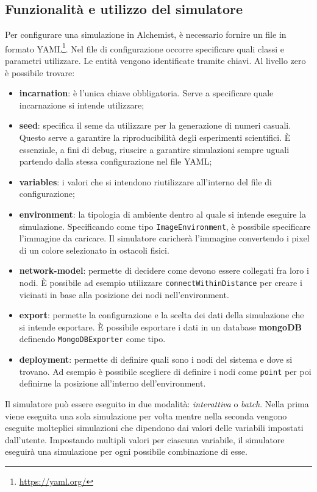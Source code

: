 \documentclass[12pt,a4paper,openright,twoside]{book}
\begin{document}
\subsection{Funzionalità e utilizzo del simulatore}
Per configurare una simulazione in Alchemist, è necessario fornire un file in formato YAML\footnote{\url{https://yaml.org/}}. Nel file di configurazione occorre specificare quali classi e parametri utilizzare. Le entità vengono identificate tramite chiavi. Al livello zero è possibile trovare: 
\begin{itemize}
    \item \textbf{incarnation}: è l'unica chiave obbligatoria. Serve a specificare quale incarnazione si intende utilizzare; 
    \item \textbf{seed}: specifica il seme da utilizzare per la generazione di numeri casuali. Questo serve a garantire la riproducibilità degli esperimenti scientifici. È essenziale, a fini di debug, riuscire a garantire simulazioni sempre uguali partendo dalla stessa configurazione nel file YAML;
    \item \textbf{variables}: i valori che si intendono riutilizzare all'interno del file di configurazione;
    \item \textbf{environment}: la tipologia di ambiente dentro al quale si intende eseguire la simulazione. Specificando come tipo \texttt{ImageEnvironment}, è possibile specificare l'immagine da caricare. Il simulatore caricherà l'immagine convertendo i pixel di un colore selezionato in ostacoli fisici.  
    \item \textbf{network-model}: permette di decidere come devono essere collegati fra loro i nodi. È possibile ad esempio utilizzare \texttt{connectWithinDistance} per creare i vicinati in base alla posizione dei nodi nell'environment. 
    \item \textbf{export}: permette la configurazione e la scelta dei dati della simulazione che si intende esportare. È possibile esportare i dati in un database \textbf{mongoDB} definendo \texttt{MongoDBExporter} come tipo. 
    \item \textbf{deployment}: permette di definire quali sono i nodi del sistema e dove si trovano. Ad esempio è possibile scegliere di definire i nodi come \texttt{point} per poi definirne la posizione all'interno dell'environment.
\end{itemize}
Il simulatore può essere eseguito in due modalità: \textit{interattiva} o \textit{batch}. Nella prima viene eseguita una sola simulazione per volta mentre nella seconda vengono eseguite molteplici simulazioni che dipendono dai valori delle variabili impostati dall'utente. Impostando multipli valori per ciascuna variabile, il simulatore eseguirà una simulazione per ogni possibile combinazione di esse. 
\end{document}
